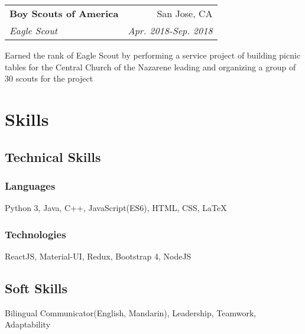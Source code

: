 \documentclass[letterpaper,8pt]{article}
\makeatletter
\newcommand{\resumeSubheading}[4]{
  \vspace{0.25em}
  \begin{tabular*}{0.97\textwidth}[t]{l@{\extracolsep{\fill}}r}
    \textbf{#1} & #2 \\
    \textit{#3} & \textit{#4} \\
  \end{tabular*}\vspace{0.25em}
}
\makeatother
\begin{document}
\resumeSubheading{Boy Scouts of America}
{San Jose, CA}{Eagle Scout}{Apr. 2018-Sep. 2018}

Earned the rank of Eagle Scout by performing a service project of building picnic tables for the Central Church of the Nazarene leading and organizing a group of 30 scouts for the project

\section{Skills}

\begin{multicols}{2}
\subsection{Technical Skills}

\subsubsection{Languages}

\begin{adjustwidth}{4em}{}
Python 3, Java, C++, JavaScript(ES6), HTML, CSS, {\LaTeX}
\end{adjustwidth}

\subsubsection{Technologies}

\begin{adjustwidth}{4em}{}
ReactJS, Material-UI, Redux, Bootstrap 4, NodeJS
\end{adjustwidth}

\columnbreak

\subsection{Soft Skills}

\begin{adjustwidth}{2em}{}
Bilingual Communicator(English, Mandarin), Leadership, Teamwork, Adaptability
\end{adjustwidth}

\end{multicols}
\end{document}
